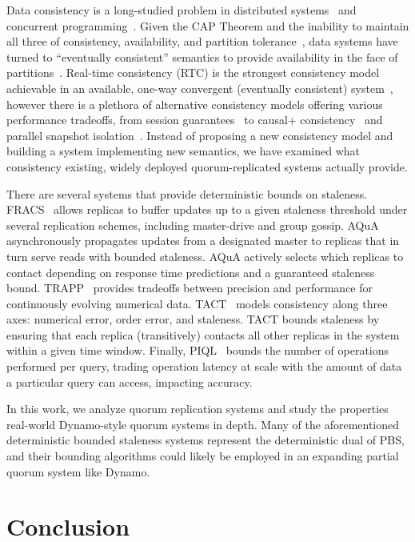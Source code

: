 \documentclass{vldb}
\newcommand{\sectionskip}{-0em}
\begin{document}
Data consistency is a long-studied problem in distributed
systems~\cite{consistency-partitioned, danger-rep} and concurrent
programming~\cite{linearizability}.  Given the CAP Theorem and the
inability to maintain all three of consistency, availability, and
partition tolerance~\cite{cap-proof}, data systems have turned to
``eventually consistent'' semantics to provide availability in the
face of partitions~\cite{consistency-partitioning, vogels-defs}.
Real-time consistency (RTC) is the strongest consistency model
achievable in an available, one-way convergent (eventually consistent)
system~\cite{rtc-proof}, however there is a plethora of alternative
consistency models offering various performance tradeoffs, from
session guarantees~\cite{sessionguarantees} to causal+
consistency~\cite{cops} and parallel snapshot isolation~\cite{walter}.
Instead of proposing a new consistency model and building a system
implementing new semantics, we have examined what consistency
existing, widely deployed quorum-replicated systems actually provide.

There are several systems that provide deterministic bounds on
staleness.  FRACS~\cite{frac} allows replicas to buffer updates up to
a given staleness threshold under several replication schemes,
including master-drive and group gossip.  AQuA~\cite{aqua}
asynchronously propagates updates from a designated master to replicas
that in turn serve reads with bounded staleness.  AQuA actively
selects which replicas to contact depending on response time
predictions and a guaranteed staleness bound.  TRAPP~\cite{trapp}
provides tradeoffs between precision and performance for continuously
evolving numerical data.  TACT~\cite{vahdat-article, vahdat-bounded}
models consistency along three axes: numerical error, order error, and
staleness.  TACT bounds staleness by ensuring that each replica
(transitively) contacts all other replicas in the system within a
given time window.  Finally, PIQL~\cite{piql} bounds the number of
operations performed per query, trading operation latency at scale
with the amount of data a particular query can access, impacting
accuracy.

In this work, we analyze quorum replication systems and study the
properties real-world Dynamo-style quorum systems in depth.  Many of
the aforementioned deterministic bounded staleness systems represent the
deterministic dual of PBS, and their bounding algorithms could likely
be employed in an expanding partial quorum system like Dynamo.

\vspace{\sectionskip}\section{Conclusion}
\label{sec:conclusion}
\end{document}
